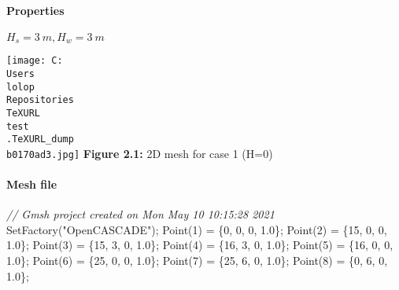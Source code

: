 \documentclass[11pt]{article}
\newenvironment{Shaded}{}{}
\newcommand{\DecValTok}[1]{\textcolor[rgb]{0.25,0.63,0.44}{{#1}}}
\newcommand{\FloatTok}[1]{\textcolor[rgb]{0.25,0.63,0.44}{{#1}}}
\newcommand{\StringTok}[1]{\textcolor[rgb]{0.25,0.44,0.63}{{#1}}}
\newcommand{\CommentTok}[1]{\textcolor[rgb]{0.38,0.63,0.69}{\textit{{#1}}}}
\newcommand{\NormalTok}[1]{{#1}}
\newcommand{\OperatorTok}[1]{\textcolor[rgb]{0.40,0.40,0.40}{{#1}}}
\begin{document}
\hypertarget{properties-1}{%
\paragraph{Properties}\label{properties-1}}

\(H_s = 3\ m, H_w = 3\ m\)

\texttt{[image: C:\\Users\\lolop\\Repositories\\TeXURL\\test\\.TeXURL\_dump\\b0170ad3.jpg]} \textbf{Figure 2.1:}
2D mesh for case 1 (H=0)

\hypertarget{mesh-file}{%
\paragraph{Mesh file}\label{mesh-file}}

\begin{Shaded}
\begin{Highlighting}[]
\CommentTok{// Gmsh project created on Mon May 10 10:15:28 2021}
\NormalTok{SetFactory}\OperatorTok{(}\StringTok{"OpenCASCADE"}\OperatorTok{);}
\NormalTok{Point}\OperatorTok{(}\DecValTok{1}\OperatorTok{)} \OperatorTok{=} \OperatorTok{\{}\DecValTok{0}\OperatorTok{,} \DecValTok{0}\OperatorTok{,} \DecValTok{0}\OperatorTok{,} \FloatTok{1.0}\OperatorTok{\};}
\NormalTok{Point}\OperatorTok{(}\DecValTok{2}\OperatorTok{)} \OperatorTok{=} \OperatorTok{\{}\DecValTok{15}\OperatorTok{,} \DecValTok{0}\OperatorTok{,} \DecValTok{0}\OperatorTok{,} \FloatTok{1.0}\OperatorTok{\};}
\NormalTok{Point}\OperatorTok{(}\DecValTok{3}\OperatorTok{)} \OperatorTok{=} \OperatorTok{\{}\DecValTok{15}\OperatorTok{,} \DecValTok{3}\OperatorTok{,} \DecValTok{0}\OperatorTok{,} \FloatTok{1.0}\OperatorTok{\};}
\NormalTok{Point}\OperatorTok{(}\DecValTok{4}\OperatorTok{)} \OperatorTok{=} \OperatorTok{\{}\DecValTok{16}\OperatorTok{,} \DecValTok{3}\OperatorTok{,} \DecValTok{0}\OperatorTok{,} \FloatTok{1.0}\OperatorTok{\};}
\NormalTok{Point}\OperatorTok{(}\DecValTok{5}\OperatorTok{)} \OperatorTok{=} \OperatorTok{\{}\DecValTok{16}\OperatorTok{,} \DecValTok{0}\OperatorTok{,} \DecValTok{0}\OperatorTok{,} \FloatTok{1.0}\OperatorTok{\};}
\NormalTok{Point}\OperatorTok{(}\DecValTok{6}\OperatorTok{)} \OperatorTok{=} \OperatorTok{\{}\DecValTok{25}\OperatorTok{,} \DecValTok{0}\OperatorTok{,} \DecValTok{0}\OperatorTok{,} \FloatTok{1.0}\OperatorTok{\};}
\NormalTok{Point}\OperatorTok{(}\DecValTok{7}\OperatorTok{)} \OperatorTok{=} \OperatorTok{\{}\DecValTok{25}\OperatorTok{,} \DecValTok{6}\OperatorTok{,} \DecValTok{0}\OperatorTok{,} \FloatTok{1.0}\OperatorTok{\};}
\NormalTok{Point}\OperatorTok{(}\DecValTok{8}\OperatorTok{)} \OperatorTok{=} \OperatorTok{\{}\DecValTok{0}\OperatorTok{,} \DecValTok{6}\OperatorTok{,} \DecValTok{0}\OperatorTok{,} \FloatTok{1.0}\OperatorTok{\};}

\end{Highlighting}
\end{Shaded}
\end{document}
